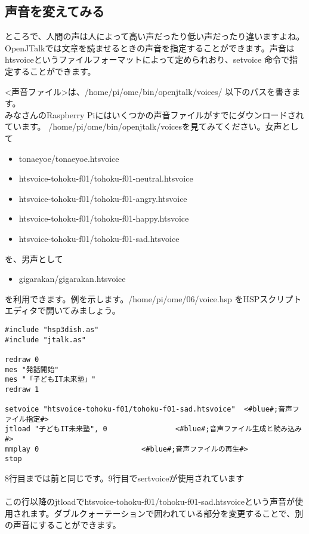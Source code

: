 \subsection{声音を変えてみる}
ところで、人間の声は人によって高い声だったり低い声だったり違いますよね。OpenJTalkでは文章を読ませるときの声音を指定することができます。声音はhtsvoiceというファイルフォーマットによって定められおり、setvoice 命令で指定することができます。\\

<声音ファイル>は、/home/pi/ome/bin/openjtalk/voices/ 以下のパスを書きます。\\
みなさんのRaspberry Piにはいくつかの声音ファイルがすでにダウンロードされています。 /home/pi/ome/bin/openjtalk/voicesを見てみてください。女声として
\begin{itemize}
\item tonaeyoe/tonaeyoe.htsvoice
\item htsvoice-tohoku-f01/tohoku-f01-neutral.htsvoice
\item htsvoice-tohoku-f01/tohoku-f01-angry.htsvoice
\item htsvoice-tohoku-f01/tohoku-f01-happy.htsvoice
\item htsvoice-tohoku-f01/tohoku-f01-sad.htsvoice
\end{itemize}
を、男声として
\begin{itemize}
\item gigarakan/gigarakan.htsvoice
\end{itemize}
を利用できます。例を示します。/home/pi/ome/06/voice.hsp をHSPスクリプトエディタで開いてみましょう。\\

\begin{lstlisting}[caption=voice.hsp,label=voice.hsp]
#include "hsp3dish.as"
#include "jtalk.as"

redraw 0
mes "発話開始"
mes "「子どもIT未来塾」"
redraw 1

setvoice "htsvoice-tohoku-f01/tohoku-f01-sad.htsvoice"	<#blue#;音声ファイル指定#>
jtload "子どもIT未来塾", 0				<#blue#;音声ファイル生成と読み込み#>
mmplay 0						<#blue#;音声ファイルの再生#>
stop
\end{lstlisting}

8行目までは前と同じです。9行目でsertvoiceが使用されています\\
\\
この行以降のjtloadでhtsvoice-tohoku-f01/tohoku-f01-sad.htsvoiceという声音が使用されます。ダブルクォーテーションで囲われている部分を変更することで、別の声音にすることができます。\\

